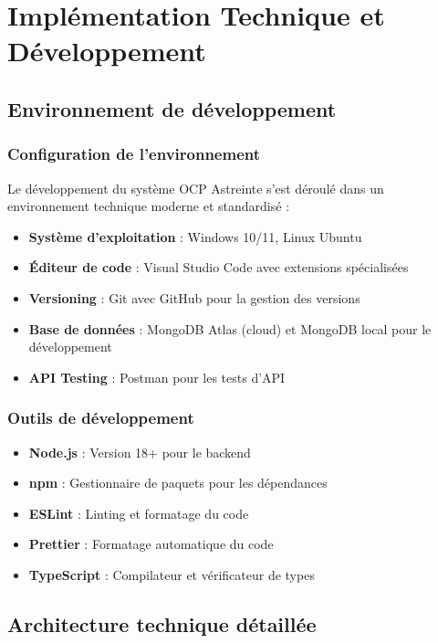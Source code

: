 \chapter{Implémentation Technique et Développement}

\section{Environnement de développement}
\subsection{Configuration de l'environnement}
Le développement du système OCP Astreinte s'est déroulé dans un environnement technique moderne et standardisé :

\begin{itemize}
    \item \textbf{Système d'exploitation} : Windows 10/11, Linux Ubuntu
    \item \textbf{Éditeur de code} : Visual Studio Code avec extensions spécialisées
    \item \textbf{Versioning} : Git avec GitHub pour la gestion des versions
    \item \textbf{Base de données} : MongoDB Atlas (cloud) et MongoDB local pour le développement
    \item \textbf{API Testing} : Postman pour les tests d'API
\end{itemize}

\subsection{Outils de développement}
\begin{itemize}
    \item \textbf{Node.js} : Version 18+ pour le backend
    \item \textbf{npm} : Gestionnaire de paquets pour les dépendances
    \item \textbf{ESLint} : Linting et formatage du code
    \item \textbf{Prettier} : Formatage automatique du code
    \item \textbf{TypeScript} : Compilateur et vérificateur de types
\end{itemize}

\section{Architecture technique détaillée}
